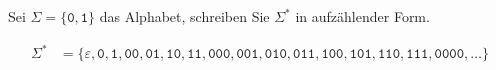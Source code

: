 Sei $\Sigma = \{\texttt{0},\texttt{1}\}$ das Alphabet, schreiben
Sie $\Sigma^*$ in aufzählender Form.


\begin{loesung}
\begin{align*}
\Sigma^*
&=
\{\varepsilon, \texttt{0}, \texttt{1},
\texttt{00}, \texttt{01}, \texttt{10}, \texttt{11},
\texttt{000},
\texttt{001},
\texttt{010},
\texttt{011},
\texttt{100},
\texttt{101},
\texttt{110},
\texttt{111},
\texttt{0000},
\dots
\}
\end{align*}
\end{loesung}

